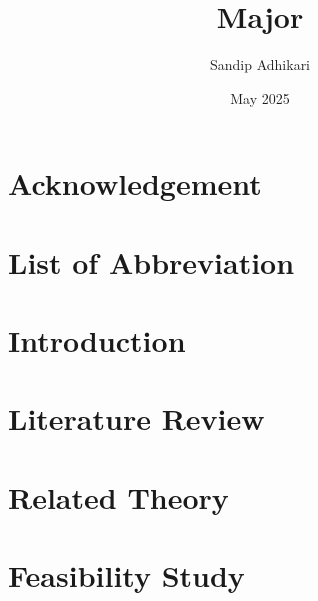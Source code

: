 \documentclass[12pt,a4paper]{report}
\title{Major}
\author{Sandip Adhikari}
\date{May 2025}
\begin{document}



\chapter*{Acknowledgement}
\label{acknowledgement}


%

\tableofcontents
\clearpage
\pagestyle{plain}

\newpage

\listoffigures
{}
\newpage

\listoftables
{}
\newpage

\chapter*{List of Abbreviation}
\label{abbreviation}

\newpage

\cleardoublepage
{}

\chapter{Introduction}
\label{introduction}


\chapter{Literature Review}
\label{literaturereview}


\chapter{Related Theory}
\label{relatedtheory}


\chapter{Feasibility Study}
\label{feasiblity}

\end{document}
